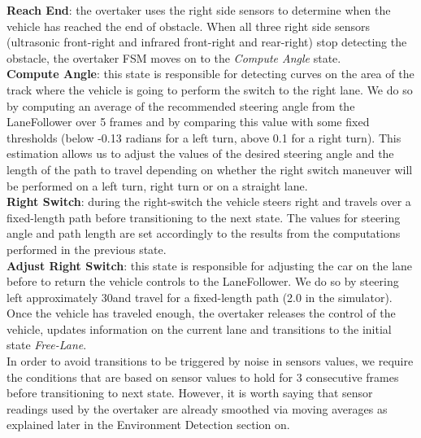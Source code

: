 \noindent
\textbf{Reach End}: the overtaker uses the right side sensors to determine when
the vehicle has reached the end of obstacle. When all three right side sensors
(ultrasonic front-right and infrared front-right and rear-right) stop detecting
the obstacle, the overtaker FSM moves on to the \textit{Compute Angle} state.\\

\noindent
\textbf{Compute Angle}: this state is responsible for detecting curves on the
area of the track where the vehicle is going to perform the switch to the right
lane. We do so by computing an average of the recommended steering angle from
the LaneFollower over 5 frames and by comparing this value with some fixed
thresholds (below -0.13 radians for a left turn, above 0.1 for a right turn).
This estimation allows us to adjust the values of the desired steering angle and
the length of the path to travel depending on whether the right switch maneuver
will be performed on a left turn, right turn or on a  straight lane.\\

\noindent
\textbf{Right Switch}: during the right-switch the vehicle steers right and
travels over a fixed-length path before transitioning to the next state. The
values for steering angle and path length are set accordingly to the results
from the computations performed in the previous state.\\

\noindent
\textbf{Adjust Right Switch}: this state is responsible for adjusting the car on
the lane before to return the vehicle controls to the LaneFollower. We do so by
steering left approximately 30\degree and travel for a fixed-length path (2.0 in
the simulator). Once the vehicle has traveled enough, the overtaker releases the
control of the vehicle, updates information on the current lane and transitions
to the initial state \textit{Free-Lane}.\\

\noindent
In order to avoid transitions to be triggered by noise in sensors values, we
require the conditions that are based on sensor values to hold for 3 consecutive
frames before transitioning to next state. However, it is worth saying that
sensor readings used by the overtaker are already smoothed via moving averages
as explained later in the Environment Detection section on.\\

